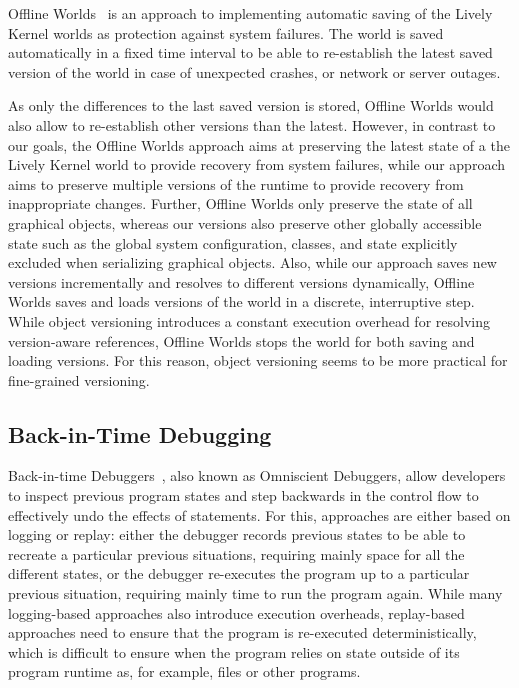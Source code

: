 Offline Worlds~\cite{Czuchra2012OfW} is an approach to implementing automatic saving of the Lively Kernel worlds as protection against system failures.
The world is saved automatically in a fixed time interval to be able to re-establish the latest saved version of the world in case of unexpected crashes, or network or server outages.

As only the differences to the last saved version is stored, Offline Worlds would also allow to re-establish other versions than the latest.
However, in contrast to our goals, the Offline Worlds approach aims at preserving the latest state of a the Lively Kernel world to provide recovery from system failures, while our approach aims to preserve multiple versions of the runtime to provide recovery from inappropriate changes.
Further, Offline Worlds only preserve the state of all graphical objects, whereas our versions also preserve other globally accessible state such as the global system configuration, classes, and state explicitly excluded when serializing graphical objects.
Also, while our approach saves new versions incrementally and resolves to different versions dynamically, Offline Worlds saves and loads versions of the world in a discrete, interruptive step.
While object versioning introduces a constant execution overhead for resolving version-aware references, Offline Worlds stops the world for both saving and loading versions.
For this reason, object versioning seems to be more practical for fine-grained versioning.



\subsection{Back-in-Time Debugging}

Back-in-time Debuggers~\cite{Lewis2003BIT}, also known as Omniscient Debuggers, allow developers to inspect previous program states and step backwards in the control flow to effectively undo the effects of statements.
For this, approaches are either based on logging or replay: either the debugger records previous states to be able to recreate a particular previous situations, requiring mainly space for all the different states, or the debugger re-executes the program up to a particular previous situation, requiring mainly time to run the program again.
While many logging-based approaches also introduce execution overheads, replay-based approaches need to ensure that the program is re-executed deterministically, which is difficult to ensure when the program relies on state outside of its program runtime as, for example, files or other programs.

